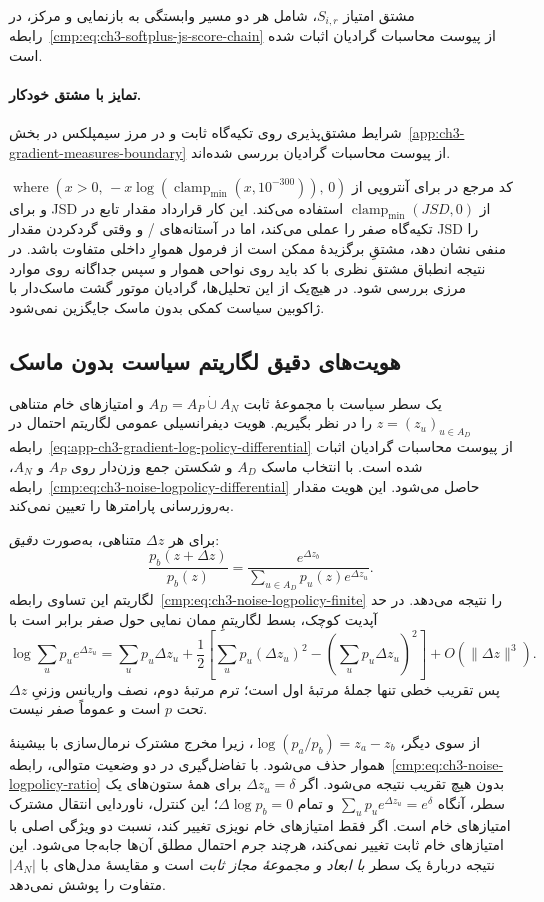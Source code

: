 مشتق امتیاز $S_{i,r}$، شامل هر دو مسیر
وابستگی به بازنمایی و مرکز، در
رابطه~\eqref{cmp:eq:ch3-softplus-js-score-chain}
از پیوست محاسبات گرادیان اثبات شده است.

\paragraph{تمایز با مشتق خودکار.}
شرایط مشتق‌پذیری روی تکیه‌گاه ثابت و در مرز
سیمپلکس در بخش~\ref{app:ch3-gradient-measures-boundary}
از پیوست محاسبات گرادیان بررسی شده‌اند.

کد مرجع در  برای آنتروپی
از $\operatorname{where}(x>0,\,
-x\log(\operatorname{clamp}_{\min}(x,10^{-300})),\,0)$
و برای JSD از $\operatorname{clamp}_{\min}(JSD,0)$
استفاده می‌کند. این کار قرارداد مقدار تابع در
تکیه‌گاه صفر را عملی می‌کند، اما در آستانه‌های
/ و وقتی گردکردن مقدار JSD
را منفی نشان دهد، مشتقِ برگزیدهٔ 
ممکن است از فرمول هموارِ داخلی متفاوت باشد.
در نتیجه انطباق مشتق نظری با کد باید روی نواحی
هموار و سپس جداگانه روی موارد مرزی بررسی شود.
در هیچ‌یک از این تحلیل‌ها، گرادیان موتور گشت
ماسک‌دار با ژاکوبین سیاست کمکی بدون ماسک
جایگزین نمی‌شود.

\subsection{هویت‌های دقیق لگاریتم سیاست بدون ماسک}
\label{app:ch3-unmasked-logpolicy-proof}
یک سطر سیاست با مجموعهٔ ثابت
$A_D=A_P\mathbin{\dot\cup}A_N$ و امتیازهای خام متناهی
$z=(z_u)_{u\in A_D}$ را در نظر بگیریم.
هویت دیفرانسیلی عمومی لگاریتم احتمال در
رابطه~\eqref{eq:app-ch3-gradient-log-policy-differential}
از پیوست محاسبات گرادیان اثبات شده است.
با انتخاب ماسک $A_D$ و شکستن جمع وزن‌دار
روی $A_P$ و $A_N$،
رابطه~\eqref{cmp:eq:ch3-noise-logpolicy-differential}
حاصل می‌شود. این هویت مقدار به‌روزرسانی
پارامترها را تعیین نمی‌کند.

برای هر $\Delta z$ متناهی، به‌صورت \emph{دقیق}:
\[
\frac{p_b(z+\Delta z)}{p_b(z)}
=\frac{e^{\Delta z_b}}
{\sum_{u\in A_D}p_u(z)e^{\Delta z_u}}.
\]
لگاریتم این تساوی
رابطه~\eqref{cmp:eq:ch3-noise-logpolicy-finite}
را نتیجه می‌دهد. در حد آپدیت کوچک، بسط
لگاریتمِ ممان نمایی حول صفر برابر است با
\[
\log\sum_up_ue^{\Delta z_u}
=\sum_up_u\Delta z_u
+\frac12\left[\sum_up_u(\Delta z_u)^2
-\left(\sum_up_u\Delta z_u\right)^2\right]
+O(\|\Delta z\|^3).
\]
پس تقریب خطی تنها جملهٔ مرتبهٔ اول است؛
ترم مرتبهٔ دوم، نصف واریانس وزنیِ $\Delta z$
تحت $p$ است و عموماً صفر نیست.

از سوی دیگر،
$\log(p_a/p_b)=z_a-z_b$،
زیرا مخرج مشترک نرمال‌سازی با بیشینهٔ هموار حذف می‌شود.
با تفاضل‌گیری در دو وضعیت متوالی،
رابطه~\eqref{cmp:eq:ch3-noise-logpolicy-ratio}
بدون هیچ تقریب نتیجه می‌شود.
اگر $\Delta z_u=\delta$ برای همهٔ ستون‌های یک سطر،
آنگاه $\sum_up_ue^{\Delta z_u}=e^\delta$
و تمام $\Delta\log p_b=0$؛ این کنترل،
ناوردایی انتقال مشترک امتیازهای خام است.
اگر فقط امتیازهای خام نویزی تغییر کند، نسبت دو
ویژگی اصلی با امتیازهای خام ثابت تغییر نمی‌کند،
هرچند جرم احتمال مطلق آن‌ها جابه‌جا می‌شود.
این نتیجه دربارهٔ یک سطر \emph{با ابعاد و
مجموعهٔ مجاز ثابت} است و مقایسهٔ مدل‌های با
$|A_N|$ متفاوت را پوشش نمی‌دهد.

